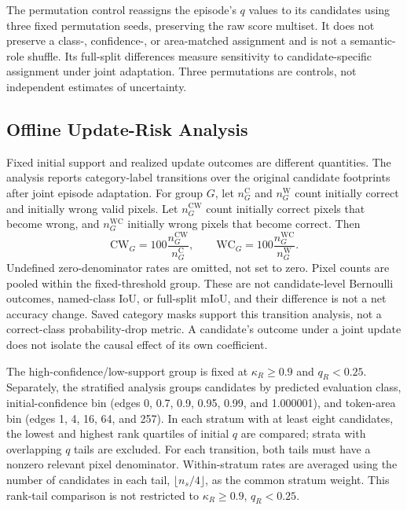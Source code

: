 The permutation control reassigns the episode's $q$ values to its candidates using three fixed permutation seeds, preserving the raw score multiset. It does not preserve a class-, confidence-, or area-matched assignment and is not a semantic-role shuffle. Its full-split differences measure sensitivity to candidate-specific assignment under joint adaptation. Three permutations are controls, not independent estimates of uncertainty.

\subsection{Offline Update-Risk Analysis}
Fixed initial support and realized update outcomes are different quantities. The analysis reports category-label transitions over the original candidate footprints after joint episode adaptation. For group $G$, let $n_G^{\mathrm C}$ and $n_G^{\mathrm W}$ count initially correct and initially wrong valid pixels. Let $n_G^{\mathrm{CW}}$ count initially correct pixels that become wrong, and $n_G^{\mathrm{WC}}$ initially wrong pixels that become correct. Then
\begin{equation}
\mathrm{CW}_G=100\frac{n_G^{\mathrm{CW}}}{n_G^{\mathrm C}},\qquad
\mathrm{WC}_G=100\frac{n_G^{\mathrm{WC}}}{n_G^{\mathrm W}}.
\end{equation}
Undefined zero-denominator rates are omitted, not set to zero. Pixel counts are pooled within the fixed-threshold group. These are not candidate-level Bernoulli outcomes, named-class IoU, or full-split mIoU, and their difference is not a net accuracy change. Saved category masks support this transition analysis, not a correct-class probability-drop metric. A candidate's outcome under a joint update does not isolate the causal effect of its own coefficient.

The high-confidence/low-support group is fixed at $\kappa_R\geq0.9$ and $q_R<0.25$. Separately, the stratified analysis groups candidates by predicted evaluation class, initial-confidence bin (edges 0, 0.7, 0.9, 0.95, 0.99, and 1.000001), and token-area bin (edges 1, 4, 16, 64, and 257). In each stratum with at least eight candidates, the lowest and highest rank quartiles of initial $q$ are compared; strata with overlapping $q$ tails are excluded. For each transition, both tails must have a nonzero relevant pixel denominator. Within-stratum rates are averaged using the number of candidates in each tail, $\lfloor n_s/4\rfloor$, as the common stratum weight. This rank-tail comparison is not restricted to $\kappa_R\geq0.9$, $q_R<0.25$.

